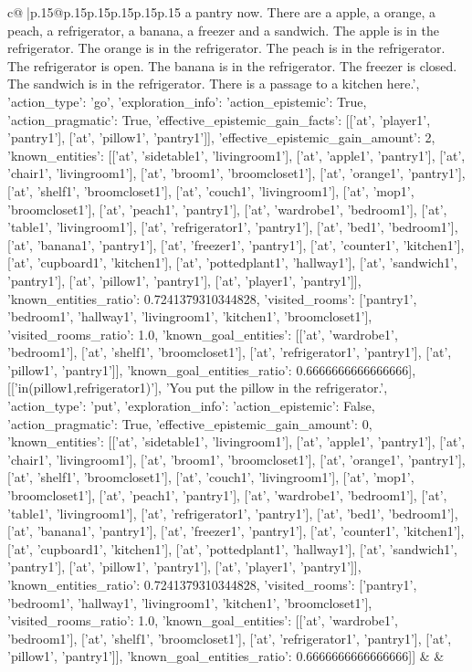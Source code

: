 \documentclass{article}
\begin{document}
{\begin{supertabular}{c@{$\;$}|p{.15\linewidth}@{}p{.15\linewidth}p{.15\linewidth}p{.15\linewidth}p{.15\linewidth}p{.15\linewidth}}
{{{a pantry now. There are a apple, a orange, a peach, a refrigerator, a banana, a freezer and a sandwich. The apple is in the refrigerator. The orange is in the refrigerator. The peach is in the refrigerator. The refrigerator is open. The banana is in the refrigerator. The freezer is closed. The sandwich is in the refrigerator. There is a passage to a kitchen here.', {'action_type': 'go', 'exploration_info': {'action_epistemic': True, 'action_pragmatic': True, 'effective_epistemic_gain_facts': [['at', 'player1', 'pantry1'], ['at', 'pillow1', 'pantry1']], 'effective_epistemic_gain_amount': 2, 'known_entities': [['at', 'sidetable1', 'livingroom1'], ['at', 'apple1', 'pantry1'], ['at', 'chair1', 'livingroom1'], ['at', 'broom1', 'broomcloset1'], ['at', 'orange1', 'pantry1'], ['at', 'shelf1', 'broomcloset1'], ['at', 'couch1', 'livingroom1'], ['at', 'mop1', 'broomcloset1'], ['at', 'peach1', 'pantry1'], ['at', 'wardrobe1', 'bedroom1'], ['at', 'table1', 'livingroom1'], ['at', 'refrigerator1', 'pantry1'], ['at', 'bed1', 'bedroom1'], ['at', 'banana1', 'pantry1'], ['at', 'freezer1', 'pantry1'], ['at', 'counter1', 'kitchen1'], ['at', 'cupboard1', 'kitchen1'], ['at', 'pottedplant1', 'hallway1'], ['at', 'sandwich1', 'pantry1'], ['at', 'pillow1', 'pantry1'], ['at', 'player1', 'pantry1']], 'known_entities_ratio': 0.7241379310344828, 'visited_rooms': ['pantry1', 'bedroom1', 'hallway1', 'livingroom1', 'kitchen1', 'broomcloset1'], 'visited_rooms_ratio': 1.0, 'known_goal_entities': [['at', 'wardrobe1', 'bedroom1'], ['at', 'shelf1', 'broomcloset1'], ['at', 'refrigerator1', 'pantry1'], ['at', 'pillow1', 'pantry1']], 'known_goal_entities_ratio': 0.6666666666666666}}], [['in(pillow1,refrigerator1)'], 'You put the pillow in the refrigerator.', {'action_type': 'put', 'exploration_info': {'action_epistemic': False, 'action_pragmatic': True, 'effective_epistemic_gain_amount': 0, 'known_entities': [['at', 'sidetable1', 'livingroom1'], ['at', 'apple1', 'pantry1'], ['at', 'chair1', 'livingroom1'], ['at', 'broom1', 'broomcloset1'], ['at', 'orange1', 'pantry1'], ['at', 'shelf1', 'broomcloset1'], ['at', 'couch1', 'livingroom1'], ['at', 'mop1', 'broomcloset1'], ['at', 'peach1', 'pantry1'], ['at', 'wardrobe1', 'bedroom1'], ['at', 'table1', 'livingroom1'], ['at', 'refrigerator1', 'pantry1'], ['at', 'bed1', 'bedroom1'], ['at', 'banana1', 'pantry1'], ['at', 'freezer1', 'pantry1'], ['at', 'counter1', 'kitchen1'], ['at', 'cupboard1', 'kitchen1'], ['at', 'pottedplant1', 'hallway1'], ['at', 'sandwich1', 'pantry1'], ['at', 'pillow1', 'pantry1'], ['at', 'player1', 'pantry1']], 'known_entities_ratio': 0.7241379310344828, 'visited_rooms': ['pantry1', 'bedroom1', 'hallway1', 'livingroom1', 'kitchen1', 'broomcloset1'], 'visited_rooms_ratio': 1.0, 'known_goal_entities': [['at', 'wardrobe1', 'bedroom1'], ['at', 'shelf1', 'broomcloset1'], ['at', 'refrigerator1', 'pantry1'], ['at', 'pillow1', 'pantry1']], 'known_goal_entities_ratio': 0.6666666666666666}}]] 
	  } 
	   } 
	   } 
	 & & \\ 
 


\end{supertabular}}
\end{document}
